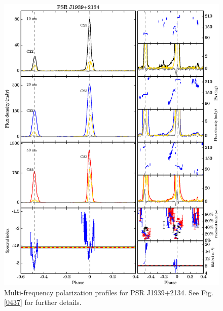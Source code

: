 \documentclass[useAMS,usenatbib]{mn2e}
\begin{document}
\begin{appendix}
\begin{figure}
\begin{center}
\includegraphics[width=6 in]{1939.ps}
\caption{Multi-frequency polarization profiles for PSR J1939$+$2134. 
See Fig. \ref{0437} for further details.}
\label{1939}
\end{center}
\end{figure}


\end{appendix}
\end{document}
